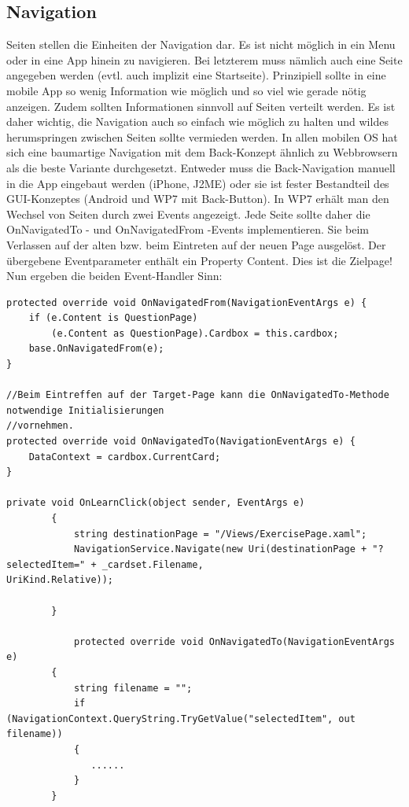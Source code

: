 \documentclass[a4paper,10pt]{scrreprt}
\begin{document}
\subsection{Navigation}
Seiten stellen die Einheiten der Navigation dar. Es ist nicht möglich in ein Menu oder in eine App hinein zu
navigieren. Bei letzterem muss nämlich auch eine Seite angegeben werden (evtl. auch implizit eine Startseite).
Prinzipiell sollte in eine mobile App so wenig Information wie möglich und so viel wie gerade nötig anzeigen.
Zudem sollten Informationen sinnvoll auf Seiten verteilt werden. Es ist daher wichtig, die Navigation auch so
einfach wie möglich zu halten und wildes herumspringen zwischen Seiten sollte vermieden werden.
In allen mobilen OS hat sich eine baumartige Navigation mit dem Back-Konzept ähnlich zu Webbrowsern als die
beste Variante durchgesetzt. Entweder muss die Back-Navigation manuell in die App eingebaut werden (iPhone,
J2ME) oder sie ist fester Bestandteil des GUI-Konzeptes (Android und WP7 mit Back-Button).
In WP7 erhält man den Wechsel von Seiten durch zwei Events angezeigt. Jede Seite sollte daher die
OnNavigatedTo - und OnNavigatedFrom -Events implementieren. Sie beim Verlassen auf der alten bzw. beim
Eintreten auf der neuen Page ausgelöst. Der übergebene Eventparameter enthält ein Property Content. Dies ist
die Zielpage! Nun ergeben die beiden Event-Handler Sinn:

\begin{lstlisting}[caption=Navigation]
protected override void OnNavigatedFrom(NavigationEventArgs e) {
	if (e.Content is QuestionPage)
		(e.Content as QuestionPage).Cardbox = this.cardbox;
	base.OnNavigatedFrom(e);
}

//Beim Eintreffen auf der Target-Page kann die OnNavigatedTo-Methode notwendige Initialisierungen
//vornehmen.
protected override void OnNavigatedTo(NavigationEventArgs e) {
	DataContext = cardbox.CurrentCard;
}

private void OnLearnClick(object sender, EventArgs e)
        {
            string destinationPage = "/Views/ExercisePage.xaml";
            NavigationService.Navigate(new Uri(destinationPage + "?selectedItem=" + _cardset.Filename, 
UriKind.Relative));
            
        }
        
            protected override void OnNavigatedTo(NavigationEventArgs e)
        {
            string filename = "";
            if (NavigationContext.QueryString.TryGetValue("selectedItem", out filename))
            {
               ......
            }
        }
        
        
        

\end{lstlisting}
\end{document}
